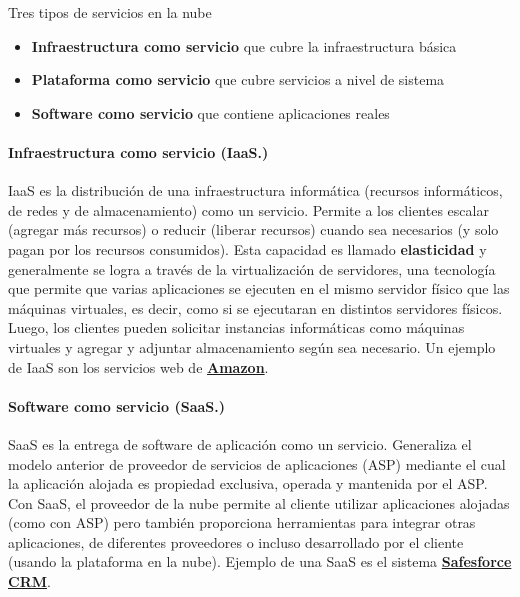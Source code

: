		{Tres tipos de servicios en la nube \cite{Ozsu2020}		 
			\begin{itemize} 	
				\item \textbf{Infraestructura como servicio} que cubre la infraestructura básica				
				\item \textbf{Plataforma como servicio} que cubre servicios a nivel de sistema 			
				\item  \textbf{Software como servicio} que contiene aplicaciones reales
			\end{itemize}
		

 
 \paragraph{Infraestructura como servicio (IaaS.)} IaaS es la distribución de una infraestructura informática  (recursos informáticos, de redes y de almacenamiento) como un servicio. Permite a los clientes escalar (agregar más recursos) o reducir (liberar recursos) cuando sea  necesarios (y solo pagan por los recursos consumidos). Esta  capacidad es  llamado \textbf{elasticidad} y generalmente se logra a través de la virtualización de servidores, una tecnología  que permite que varias aplicaciones se ejecuten en el mismo servidor físico que las máquinas virtuales, es decir, como si se ejecutaran en distintos servidores físicos. Luego, los clientes pueden solicitar instancias informáticas como máquinas virtuales y agregar y adjuntar almacenamiento según sea necesario. Un ejemplo de IaaS  son los servicios web de \textbf{\href{https://aws.amazon.com/es/}{Amazon}}. 
 
\paragraph{Software como servicio (SaaS.)} SaaS es la entrega de software de aplicación como  un servicio. Generaliza el modelo anterior de proveedor de servicios de aplicaciones (ASP)  mediante el cual la aplicación alojada es propiedad exclusiva, operada y mantenida por el  ASP. Con SaaS, el proveedor de la nube permite al cliente utilizar aplicaciones alojadas
 (como con ASP) pero también proporciona herramientas para integrar otras aplicaciones, de diferentes  proveedores o incluso desarrollado por el cliente (usando la plataforma en la nube).
 Ejemplo de una SaaS   es el sistema \textbf{\href{https://www.salesforce.com/mx/?ir=1}{Safesforce CRM}}.
 
}
